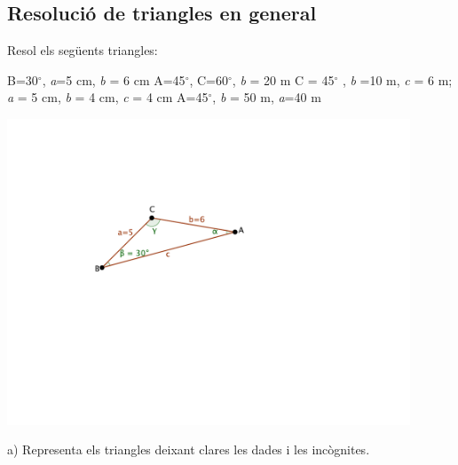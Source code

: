 \subsection{Resolució de triangles en general}
\begin{mylist}
	
	
   	\vspace{-3cm}
\exer \begin{minipage}[t]{0.4\textwidth}
	Resol els següents triangles:  \vspace{0.2cm}
	\begin{tasks}
		\task B=30${}^\circ$, \emph{a}=5 cm, \emph{b} = 6 cm \vspace{0.2cm}
		\task A=45${}^\circ$, C=60${}^\circ$, \emph{b} = 20 m \vspace{0.2cm}
		\task C = 45${}^\circ$ , \emph{b} =10 m, \emph{c} = 6 m;  \vspace{0.2cm}
		\task \emph{a} = 5 cm, \emph{b} = 4 cm, \emph{c} = 4 cm \vspace{0.2cm}
		\task A=45${}^\circ$, \emph{b} = 50 m, \emph{a}=40 m
	\end{tasks}
\end{minipage}
\begin{minipage}{0.45\textwidth}
	
	\vspace{3cm}
	
	\includegraphics[width=0.9\textwidth]{img-03/trig-sample-triangle}
	
	{\footnotesize a) Representa els triangles deixant clares les dades i les incògnites.}
\end{minipage}
	\answers[cols=1]{[
 $A=24.52$; $C=125.38$; $c=9.78$,
$B=75$; $a=14.64$; $c=17.93$,
 No existeix cap triangle,
$A=77.36$; $B=C=51.32$,
Solució 1: $B=62.1$; $C=72.9$; $c=54.1$. 
Solució 2: $B=117.9$; $C=17.1$; $c=16.64$.]}
	

\end{mylist}
